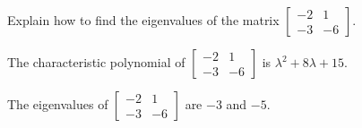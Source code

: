 
\begin{exerciseStatement}


Explain how to find the eigenvalues of the matrix \( \left[\begin{array}{cc}
-2 & 1 \\
-3 & -6
\end{array}\right] \).


\end{exerciseStatement}
    
\begin{exerciseAnswer} 


The characteristic polynomial of \( \left[\begin{array}{cc}
-2 & 1 \\
-3 & -6
\end{array}\right] \) is \( \lambda^{2} + 8 \lambda + 15 \).



The eigenvalues of \( \left[\begin{array}{cc}
-2 & 1 \\
-3 & -6
\end{array}\right] \) are \( -3 \) and \( -5 \).


\end{exerciseAnswer}
    
